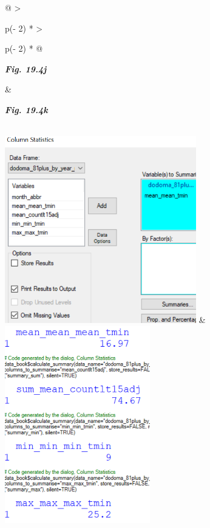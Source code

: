 \documentclass[
  letterpaper,
  DIV=11,
  numbers=noendperiod]{scrreprt}
\begin{document}
\begin{longtable}[]{@{}
  >{\raggedright\arraybackslash}p{(\columnwidth - 2\tabcolsep) * }
  >{\raggedright\arraybackslash}p{(\columnwidth - 2\tabcolsep) * }@{}}
\toprule\noalign{}
\begin{minipage}[b]{\linewidth}\raggedright
\textbf{\emph{Fig. 19.4j}}
\end{minipage} & \begin{minipage}[b]{\linewidth}\raggedright
\textbf{\emph{Fig. 19.4k}}
\end{minipage} \\
\midrule\noalign{}
\endhead
\bottomrule\noalign{}
\endlastfoot
\includegraphics[width=3.28187in,height=3.19849in]{figures/Fig19.4j.png}
&
\includegraphics[width=2.4934in,height=3.37342in]{figures/Fig19.4k.png} \\
\end{longtable}

\end{document}
